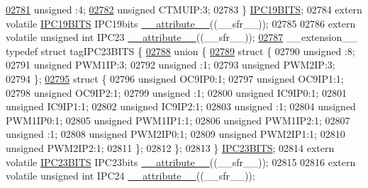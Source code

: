 \begin{DoxyCode}
\hypertarget{a00009_source_l02781}{}\hyperlink{a00008_adf71f3d8410c1f1dbbc96680a92c49af}{02781}   \textcolor{keywordtype}{unsigned} :4;
\hypertarget{a00009_source_l02782}{}\hyperlink{a00008_a5c21767b195cc6c804b5ae462d0f721b}{02782}   \textcolor{keywordtype}{unsigned} CTMUIP:3;
02783 \} \hyperlink{a00008_d5/d81/a00528}{IPC19BITS};
02784 \textcolor{keyword}{extern} \textcolor{keyword}{volatile} \hyperlink{a00008_d5/d81/a00528}{IPC19BITS} IPC19bits \hyperlink{a00009_a493c46f03454991ccc5aa7a6e1dfb2a7}{\_\_attribute\_\_}((\_\_sfr\_\_));
02785 
02786 \textcolor{keyword}{extern} \textcolor{keyword}{volatile} \textcolor{keywordtype}{unsigned} \textcolor{keywordtype}{int}  IPC23 \hyperlink{a00009_a493c46f03454991ccc5aa7a6e1dfb2a7}{\_\_attribute\_\_}((\_\_sfr\_\_));
\hypertarget{a00009_source_l02787}{}\hyperlink{a00008}{02787} \_\_extension\_\_ \textcolor{keyword}{typedef} \textcolor{keyword}{struct }tagIPC23BITS \{
\hypertarget{a00009_source_l02788}{}\hyperlink{a00009}{02788}   \textcolor{keyword}{union }\{
\hypertarget{a00009_source_l02789}{}\hyperlink{a00009}{02789}     \textcolor{keyword}{struct }\{
02790       \textcolor{keywordtype}{unsigned} :8;
02791       \textcolor{keywordtype}{unsigned} PWM1IP:3;
02792       \textcolor{keywordtype}{unsigned} :1;
02793       \textcolor{keywordtype}{unsigned} PWM2IP:3;
02794     \};
\hypertarget{a00009_source_l02795}{}\hyperlink{a00009}{02795}     \textcolor{keyword}{struct }\{
02796       \textcolor{keywordtype}{unsigned} OC9IP0:1;
02797       \textcolor{keywordtype}{unsigned} OC9IP1:1;
02798       \textcolor{keywordtype}{unsigned} OC9IP2:1;
02799       \textcolor{keywordtype}{unsigned} :1;
02800       \textcolor{keywordtype}{unsigned} IC9IP0:1;
02801       \textcolor{keywordtype}{unsigned} IC9IP1:1;
02802       \textcolor{keywordtype}{unsigned} IC9IP2:1;
02803       \textcolor{keywordtype}{unsigned} :1;
02804       \textcolor{keywordtype}{unsigned} PWM1IP0:1;
02805       \textcolor{keywordtype}{unsigned} PWM1IP1:1;
02806       \textcolor{keywordtype}{unsigned} PWM1IP2:1;
02807       \textcolor{keywordtype}{unsigned} :1;
02808       \textcolor{keywordtype}{unsigned} PWM2IP0:1;
02809       \textcolor{keywordtype}{unsigned} PWM2IP1:1;
02810       \textcolor{keywordtype}{unsigned} PWM2IP2:1;
02811     \};
02812   \};
02813 \} \hyperlink{a00008_d7/d41/a00532}{IPC23BITS};
02814 \textcolor{keyword}{extern} \textcolor{keyword}{volatile} \hyperlink{a00008_d7/d41/a00532}{IPC23BITS} IPC23bits \hyperlink{a00009_a493c46f03454991ccc5aa7a6e1dfb2a7}{\_\_attribute\_\_}((\_\_sfr\_\_));
02815 
02816 \textcolor{keyword}{extern} \textcolor{keyword}{volatile} \textcolor{keywordtype}{unsigned} \textcolor{keywordtype}{int}  IPC24 \hyperlink{a00009_a493c46f03454991ccc5aa7a6e1dfb2a7}{\_\_attribute\_\_}((\_\_sfr\_\_));

\end{DoxyCode}
